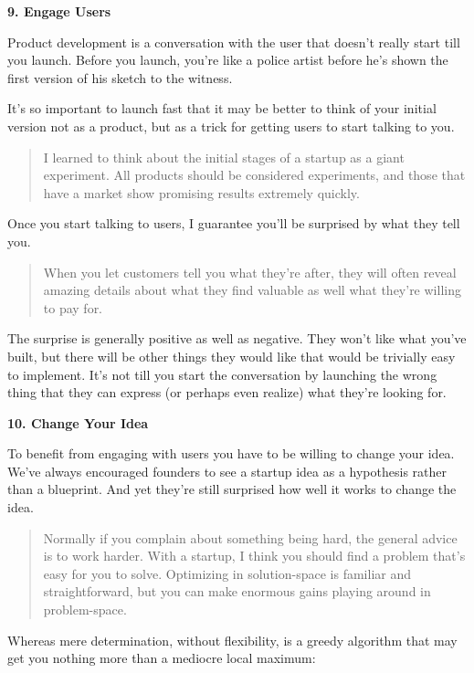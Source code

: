 \textbf{9. Engage Users}

Product development is a conversation with the user that doesn't really
start till you launch. Before you launch, you're like a police artist
before he's shown the first version of his sketch to the witness.

It's so important to launch fast that it may be better to think of your
initial version not as a product, but as a trick for getting users to
start talking to you.

\begin{quote}
I learned to think about the initial stages of a startup as a giant
experiment. All products should be considered experiments, and those
that have a market show promising results extremely quickly.
\end{quote}

Once you start talking to users, I guarantee you'll be surprised by what
they tell you.

\begin{quote}
When you let customers tell you what they're after, they will often
reveal amazing details about what they find valuable as well what
they're willing to pay for.
\end{quote}

The surprise is generally positive as well as negative. They won't like
what you've built, but there will be other things they would like that
would be trivially easy to implement. It's not till you start the
conversation by launching the wrong thing that they can express (or
perhaps even realize) what they're looking for.

\textbf{10. Change Your Idea}

To benefit from engaging with users you have to be willing to change
your idea. We've always encouraged founders to see a startup idea as a
hypothesis rather than a blueprint. And yet they're still surprised how
well it works to change the idea.

\begin{quote}
Normally if you complain about something being hard, the general advice
is to work harder. With a startup, I think you should find a problem
that's easy for you to solve. Optimizing in solution-space is familiar
and straightforward, but you can make enormous gains playing around in
problem-space.
\end{quote}

Whereas mere determination, without flexibility, is a greedy algorithm
that may get you nothing more than a mediocre local maximum:

